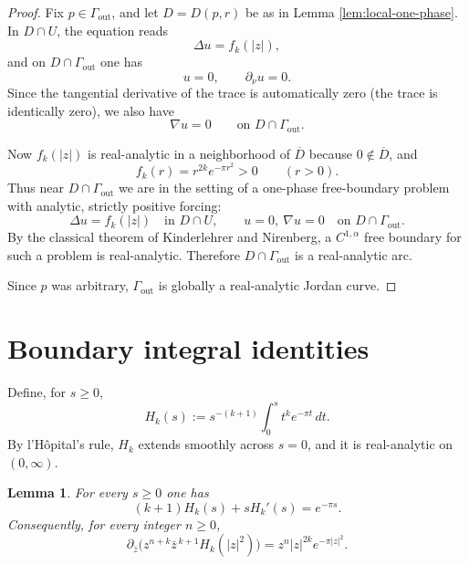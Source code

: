 \documentclass[11pt]{amsart}
\newtheorem{lemma}[theorem]{Lemma}
\theoremstyle{remark}
\newcommand{\1}{\mathbf 1}
\newcommand{\pb}{\partial_{\bar z}}
\begin{document}
\begin{proof}
Fix $p\in \Gamma_{\mathrm{out}}$, and let $D=D(p,r)$ be as in Lemma \ref{lem:local-one-phase}. In $D\cap U$, the equation reads
\[
\Delta u = f_k(|z|),
\]
and on $D\cap \Gamma_{\mathrm{out}}$ one has
\[
u=0,\qquad \partial_\nu u=0.
\]
Since the tangential derivative of the trace is automatically zero (the trace is identically zero), we also have
\[
\nabla u=0
\qquad\text{on }D\cap \Gamma_{\mathrm{out}}.
\]

Now $f_k(|z|)$ is real-analytic in a neighborhood of $\overline D$ because $0\notin \overline D$, and
\[
f_k(r)=r^{2k}e^{-\pi r^2}>0
\qquad (r>0).
\]
Thus near $D\cap \Gamma_{\mathrm{out}}$ we are in the setting of a one-phase free-boundary problem with analytic, strictly positive forcing:
\[
\Delta u=f_k(|z|)\quad\text{in }D\cap U,
\qquad
u=0,\ \nabla u=0\quad\text{on }D\cap \Gamma_{\mathrm{out}}.
\]
By the classical theorem of Kinderlehrer and Nirenberg, a $C^{1,\alpha}$ free boundary for such a problem is real-analytic. Therefore $D\cap \Gamma_{\mathrm{out}}$ is a real-analytic arc.

Since $p$ was arbitrary, $\Gamma_{\mathrm{out}}$ is globally a real-analytic Jordan curve.
\end{proof}

\section{Boundary integral identities}

Define, for $s\ge 0$,
\begin{equation}\label{eq:Hk-def}
H_k(s):=s^{-(k+1)}\int_0^s t^k e^{-\pi t}\,dt.
\end{equation}
By l'H\^opital's rule, $H_k$ extends smoothly across $s=0$, and it is real-analytic on $(0,\infty)$.

\begin{lemma}\label{lem:Hk-ode}
For every $s\ge 0$ one has
\begin{equation}\label{eq:Hk-identity}
(k+1)H_k(s)+sH_k'(s)=e^{-\pi s}.
\end{equation}
Consequently, for every integer $n\ge 0$,
\begin{equation}\label{eq:pb-primitive}
\pb\!\Big(z^{n+k}\bar z^{\,k+1}H_k(|z|^2)\Big)
=
z^n |z|^{2k}e^{-\pi|z|^2}.
\end{equation}
\end{lemma}
\end{document}
